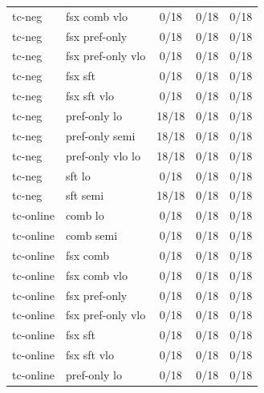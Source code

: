 \documentclass[10pt,landscape]{article}
\begin{document}
\begin{tabular}{llccc}
tc-neg & fsx comb vlo & \cellcolor{missing}0/18 & \cellcolor{missing}0/18 & \cellcolor{missing}0/18 \\
tc-neg & fsx pref-only & \cellcolor{missing}0/18 & \cellcolor{missing}0/18 & \cellcolor{missing}0/18 \\
tc-neg & fsx pref-only vlo & \cellcolor{missing}0/18 & \cellcolor{missing}0/18 & \cellcolor{missing}0/18 \\
tc-neg & fsx sft & \cellcolor{missing}0/18 & \cellcolor{missing}0/18 & \cellcolor{missing}0/18 \\
tc-neg & fsx sft vlo & \cellcolor{missing}0/18 & \cellcolor{missing}0/18 & \cellcolor{missing}0/18 \\
tc-neg & pref-only lo & \cellcolor{done}18/18 & \cellcolor{missing}0/18 & \cellcolor{missing}0/18 \\
tc-neg & pref-only semi & \cellcolor{done}18/18 & \cellcolor{missing}0/18 & \cellcolor{missing}0/18 \\
tc-neg & pref-only vlo lo & \cellcolor{done}18/18 & \cellcolor{missing}0/18 & \cellcolor{missing}0/18 \\
tc-neg & sft lo & \cellcolor{missing}0/18 & \cellcolor{missing}0/18 & \cellcolor{missing}0/18 \\
tc-neg & sft semi & \cellcolor{done}18/18 & \cellcolor{missing}0/18 & \cellcolor{missing}0/18 \\
tc-online & comb lo & \cellcolor{missing}0/18 & \cellcolor{missing}0/18 & \cellcolor{missing}0/18 \\
tc-online & comb semi & \cellcolor{missing}0/18 & \cellcolor{missing}0/18 & \cellcolor{missing}0/18 \\
tc-online & fsx comb & \cellcolor{missing}0/18 & \cellcolor{missing}0/18 & \cellcolor{missing}0/18 \\
tc-online & fsx comb vlo & \cellcolor{missing}0/18 & \cellcolor{missing}0/18 & \cellcolor{missing}0/18 \\
tc-online & fsx pref-only & \cellcolor{missing}0/18 & \cellcolor{missing}0/18 & \cellcolor{missing}0/18 \\
tc-online & fsx pref-only vlo & \cellcolor{missing}0/18 & \cellcolor{missing}0/18 & \cellcolor{missing}0/18 \\
tc-online & fsx sft & \cellcolor{missing}0/18 & \cellcolor{missing}0/18 & \cellcolor{missing}0/18 \\
tc-online & fsx sft vlo & \cellcolor{missing}0/18 & \cellcolor{missing}0/18 & \cellcolor{missing}0/18 \\
tc-online & pref-only lo & \cellcolor{missing}0/18 & \cellcolor{missing}0/18 & \cellcolor{missing}0/18 \\

\end{tabular}
\end{document}
